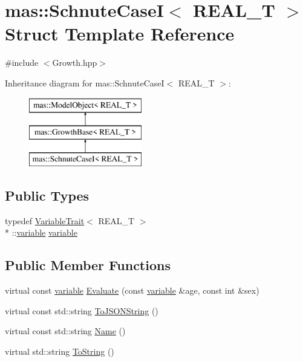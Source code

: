\hypertarget{structmas_1_1_schnute_case_i}{\section{mas\-:\-:Schnute\-Case\-I$<$ R\-E\-A\-L\-\_\-\-T $>$ Struct Template Reference}
\label{structmas_1_1_schnute_case_i}
}


{\ttfamily \#include $<$Growth.\-hpp$>$}

Inheritance diagram for mas\-:\-:Schnute\-Case\-I$<$ R\-E\-A\-L\-\_\-\-T $>$\-:\begin{figure}[H]
\begin{center}
\leavevmode
\includegraphics[height=3.000000cm]{structmas_1_1_schnute_case_i}
\end{center}
\end{figure}
\subsection*{Public Types}
\begin{DoxyCompactItemize}
\item 
typedef \hyperlink{structmas_1_1_variable_trait}{Variable\-Trait}$<$ R\-E\-A\-L\-\_\-\-T $>$\\*
\-::\hyperlink{structmas_1_1_schnute_case_i_a6655933b5cf46aabdff359c07c095a95}{variable} \hyperlink{structmas_1_1_schnute_case_i_a6655933b5cf46aabdff359c07c095a95}{variable}
\end{DoxyCompactItemize}
\subsection*{Public Member Functions}
\begin{DoxyCompactItemize}
\item 
virtual const \hyperlink{structmas_1_1_schnute_case_i_a6655933b5cf46aabdff359c07c095a95}{variable} \hyperlink{structmas_1_1_schnute_case_i_acc1a2f969120393ef5275ee3f297dfc9}{Evaluate} (const \hyperlink{structmas_1_1_schnute_case_i_a6655933b5cf46aabdff359c07c095a95}{variable} \&age, const int \&sex)
\item 
virtual const std\-::string \hyperlink{structmas_1_1_schnute_case_i_a84e734071e4bf0cce1d36c00f94768db}{To\-J\-S\-O\-N\-String} ()
\item 
virtual const std\-::string \hyperlink{structmas_1_1_schnute_case_i_a5588227ee2b536f92b34c02d95a7d148}{Name} ()
\item 
virtual std\-::string \hyperlink{structmas_1_1_schnute_case_i_a75bd8ce2e0224680c775a70122f18232}{To\-String} ()
\end{DoxyCompactItemize}
